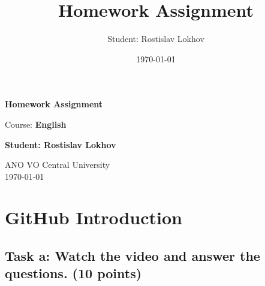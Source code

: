 \documentclass[a4paper,12pt]{article}
\title{Homework Assignment}
\author{Student: Rostislav Lokhov}
\date{\today}
\begin{document}
\begin{titlepage}
    \centering
    \vspace{1cm}

    \Huge
    \textbf{Homework Assignment}

    \vspace{0.5cm}
    \LARGE
    Course: \textbf{English}

    \vspace{1.5cm}

    \textbf{Student: Rostislav Lokhov}

    \vfill

    \Large
    ANO VO Central University\\
    \vspace{0.3cm}
    \today

\end{titlepage}

\tableofcontents
\newpage

\section{GitHub Introduction}

\subsection{Task a: Watch the video and answer the questions. (10 points)}
\end{document}
